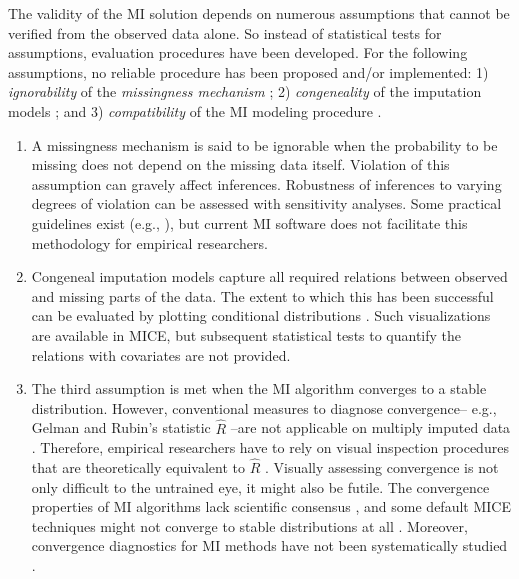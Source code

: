 \documentclass[article]{jss}
\begin{document}
The validity of the MI solution depends on numerous assumptions that cannot be verified from the observed data alone. So instead of statistical tests for assumptions, evaluation procedures have been developed. For the following assumptions, no reliable procedure has been proposed and/or implemented: 1) \emph{ignorability} of the \emph{missingness mechanism} \citep{rubin87}; 2) \emph{congeneality} of the imputation models \citep{meng94}; and 3) \emph{compatibility} of the MI modeling procedure \citep{rubin96}. 

\begin{enumerate}
\item A missingness mechanism is said to be ignorable when the probability to be missing does not depend on the missing data itself. Violation of this assumption can gravely affect inferences. Robustness of inferences to varying degrees of violation can be assessed with sensitivity analyses. Some practical guidelines exist (e.g., \citep{nguy17}), but current MI software does not facilitate this methodology for empirical researchers.  %
%
\item Congeneal imputation models capture all required relations between observed and missing parts of the data. The extent to which this has been successful can be evaluated by plotting conditional distributions \citep{abay08}. Such visualizations are available in MICE, but subsequent statistical tests to quantify the relations with covariates are not provided. 
%
\item The third assumption is met when the MI algorithm converges to a stable distribution. However, conventional measures to diagnose convergence-- e.g., Gelman and Rubin's \citeyear{gelm92} statistic $\widehat{R}$ --are not applicable on multiply imputed data \citep{lace07}. Therefore, empirical researchers have to rely on visual inspection procedures that are theoretically equivalent to $\widehat{R}$ \citep{whit11}. Visually assessing convergence is not only difficult to the untrained eye, it might also be futile. The convergence properties of MI algorithms lack scientific consensus \citep{taka17}, and some default MICE techniques might not converge to stable distributions at all \citep{murr18}. Moreover, convergence diagnostics for MI methods have not been systematically studied \citep{buur18}.
\end{enumerate}
\end{document}
